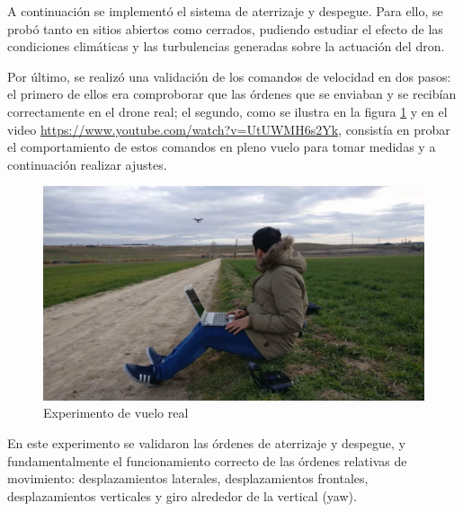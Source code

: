 A continuación se implementó el sistema de aterrizaje y despegue. Para ello, se probó tanto en sitios abiertos como cerrados, pudiendo estudiar el efecto de las condiciones climáticas y las turbulencias generadas sobre la actuación del dron.

Por último, se realizó una validación de los comandos de velocidad en dos pasos: el primero de ellos era comproborar que las órdenes que se enviaban y se recibían correctamente en el drone real; el segundo, como se ilustra en la figura \ref{fig:experimentoConjunto} y en el video \url{https://www.youtube.com/watch?v=UtUWMH6s2Yk}, consistía en probar el comportamiento de estos comandos en pleno vuelo para tomar medidas y a continuación realizar ajustes.   

\begin{figure}[H]
  \centering
  \includegraphics[scale=0.25]{imagenes/EXP2.png}
  \caption{Experimento de vuelo real}
  \label{fig:experimentoConjunto}
\end{figure}

En este experimento se validaron las órdenes de aterrizaje y despegue, y fundamentalmente el funcionamiento correcto de las órdenes relativas de movimiento: desplazamientos laterales, desplazamientos frontales, desplazamientos verticales y giro alrededor de la vertical (yaw).